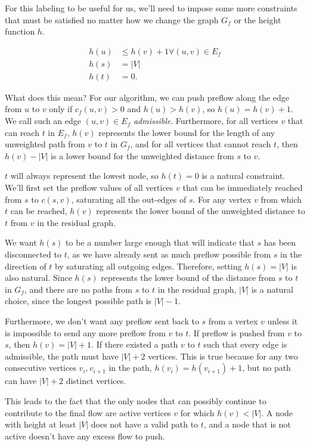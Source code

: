 For this labeling to be useful for us, we'll need to impose some more constraints that must be satisfied no matter how we change the graph $G_f$ or the height function $h$.

\begin{align*}
h(u) &\le h(v) + 1 \forall (u,v) \in E_f \\
h(s) &= |V| \\
h(t) &= 0.
\end{align*}

What does this mean? For our algorithm, we can push preflow along the edge from $u$ to $v$ only if $c_f(u,v) > 0$ and $h(u) > h(v)$, so $h(u) = h(v) + 1$. We call such an edge $(u,v) \in E_f$ \textit{admissible}. Furthermore, for all vertices $v$ that can reach $t$ in $E_f$, $h(v)$ represents the lower bound for the length of any unweighted path from $v$ to $t$ in $G_f$, and for all vertices that cannot reach $t$, then $h(v)-|V|$ is a lower bound for the unweighted distance from $s$ to $v$.

$t$ will always represent the lowest node, so $h(t)=0$ is a natural constraint. We'll first set the preflow values of all vertices $v$ that can be immediately reached from $s$ to $c(s,v)$, saturating all the out-edges of $s$. For any vertex $v$ from which $t$ can be reached, $h(v)$ represents the lower bound of the unweighted distance to $t$ from $v$ in the residual graph.

We want $h(s)$ to be a number large enough that will indicate that $s$ has been disconnected to $t$, as we have already sent as much preflow possible from $s$ in the direction of $t$ by saturating all outgoing edges. Therefore, setting $h(s)=|V|$ is also natural. Since $h(s)$ represents the lower bound of the distance from $s$ to $t$ in $G_f$, and there are no paths from $s$ to $t$ in the residual graph, $|V|$ is a natural choice, since the longest possible path is $|V|-1$.

Furthermore, we don't want any preflow sent back to $s$ from a vertex $v$ unless it is impossible to send any more preflow from $v$ to $t$. If preflow is pushed from $v$ to $s$, then $h(v) = |V| + 1$. If there existed a path $v$ to $t$ such that every edge is admissible, the path must have $|V| + 2$ vertices. This is true because for any two consecutive vertices $v_i,v_{i+1}$ in the path, $h(v_i) = h(v_{i+1}) + 1$, but no path can have $|V|+2$ distinct vertices.

This leads to the fact that the only nodes that can possibly continue to contribute to the final flow are active vertices $v$ for which $h(v) < |V|$. A node with height at least $|V|$ does not have a valid path to $t$, and a node that is not active doesn't have any excess flow to push.

